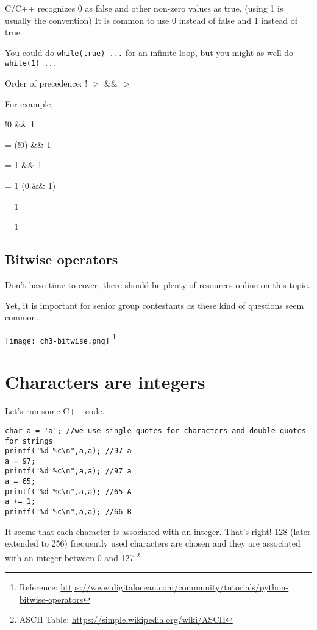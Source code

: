 C/C++ recognizes 0 as false and other non-zero values as true. (using 1 is usually the convention) It is common to use 0 instead of false and 1 instead of true.

You could do \texttt{while(true) ...} for an infinite loop, but you might as well do \texttt{while(1) ...}
\vspace{6mm}

Order of precedence: ! $>$ \&\& $>$ \textbar\textbar

For example, 

!0 \textbar{} \&\& 1

= (!0) \textbar{} \&\& 1

= 1 \textbar{} \&\& 1

= 1 \textbar\textbar (0 \&\& 1)

= 1 \textbar{}

= 1

\subsection{Bitwise operators}

Don't have time to cover, there should be plenty of resources online on this topic. 

Yet, it is important for senior group contestants as these kind of questions seem common. 

\texttt{[image: ch3-bitwise.png]}
\footnote{Reference: \href{https://www.digitalocean.com/community/tutorials/python-bitwise-operators}{https://www.digitalocean.com/community/tutorials/python-bitwise-operators}}

\section{Characters are integers}

Let's run some C++ code.

\begin{lstlisting}
char a = 'a'; //we use single quotes for characters and double quotes for strings
printf("%d %c\n",a,a); //97 a
a = 97;
printf("%d %c\n",a,a); //97 a
a = 65;
printf("%d %c\n",a,a); //65 A
a += 1;
printf("%d %c\n",a,a); //66 B
\end{lstlisting}

It seems that each character is associated with an integer. That's right! 128 (later extended to 256) frequently used characters are chosen and they are associated with an integer between 0 and 127.\footnote{ASCII Table: \href{https://simple.wikipedia.org/wiki/ASCII}{https://simple.wikipedia.org/wiki/ASCII}}

